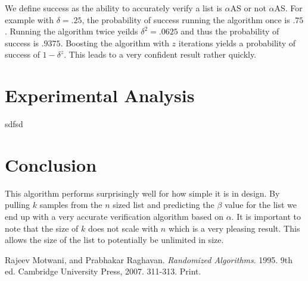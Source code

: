\documentclass[11pt]{article}
\begin{document}
We define success as the ability to accurately verify a list is $\alpha$AS or not $\alpha$AS. For example with $\delta = .25$, the probability of success running the algorithm once is $.75$. Running the algorithm twice yeilds $\delta^2 = .0625$ and thus the probability of success is $.9375$. Boosting the algorithm with $z$ iterations yields a probability of success of $1 - \delta^z$. This leads to a very confident result rather quickly. 

\section{Experimental Analysis}

sdfsd

\section{Conclusion}

This algorithm performs surprisingly well for how simple it is in design. By pulling $k$ samples from the $n$ sized list and predicting the $\beta$ value for the list we end up with a very accurate verification algorithm based on $\alpha$. It is important to note that the size of $k$ does not scale with $n$ which is a very pleasing result. This allows the size of the list to potentially be unlimited in size.  

\begin{thebibliography}{2}

Rajeev Motwani, and Prabhakar Raghavan.
\textit{Randomized Algorithms}. 1995. 9th ed.
Cambridge University Press, 2007.
311-313. Print.

\end{thebibliography}
\end{document}
